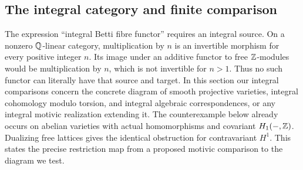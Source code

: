 \subsection{The integral category and finite comparison}

The expression ``integral Betti fibre functor'' requires an integral source. On a nonzero $\mathbb Q$-linear category, multiplication by $n$ is an invertible morphism for every positive integer $n$. Its image under an additive functor to free $\mathbb Z$-modules would be multiplication by $n$, which is not invertible for $n>1$. Thus no such functor can literally have that source and target. In this section our integral comparisons concern the concrete diagram of smooth projective varieties, integral cohomology modulo torsion, and integral algebraic correspondences, or any integral motivic realization extending it. The counterexample below already occurs on abelian varieties with actual homomorphisms and covariant $H_1(-,\mathbb Z)$. Dualizing free lattices gives the identical obstruction for contravariant $H^1$. This states the precise restriction map from a proposed motivic comparison to the diagram we test.

